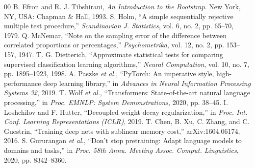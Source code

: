 \documentclass[conference]{IEEEtran}
\begin{document}
\begin{thebibliography}{00}
 B. Efron and R. J. Tibshirani, \textit{An Introduction to the Bootstrap}. New York, NY, USA: Chapman \& Hall, 1993.
 S. Holm, ``A simple sequentially rejective multiple test procedure,'' \textit{Scandinavian J. Statistics}, vol. 6, no. 2, pp. 65--70, 1979.
 Q. McNemar, ``Note on the sampling error of the difference between correlated proportions or percentages,'' \textit{Psychometrika}, vol. 12, no. 2, pp. 153--157, 1947.
 T. G. Dietterich, ``Approximate statistical tests for comparing supervised classification learning algorithms,'' \textit{Neural Computation}, vol. 10, no. 7, pp. 1895--1923, 1998.
 A. Paszke \textit{et al.}, ``PyTorch: An imperative style, high-performance deep learning library,'' in \textit{Advances in Neural Information Processing Systems 32}, 2019.
 T. Wolf \textit{et al.}, ``Transformers: State-of-the-art natural language processing,'' in \textit{Proc. EMNLP: System Demonstrations}, 2020, pp. 38--45.
 I. Loshchilov and F. Hutter, ``Decoupled weight decay regularization,'' in \textit{Proc. Int. Conf. Learning Representations (ICLR)}, 2019.
 T. Chen, B. Xu, C. Zhang, and C. Guestrin, ``Training deep nets with sublinear memory cost,'' arXiv:1604.06174, 2016.
 S. Gururangan \textit{et al.}, ``Don't stop pretraining: Adapt language models to domains and tasks,'' in \textit{Proc. 58th Annu. Meeting Assoc. Comput. Linguistics}, 2020, pp. 8342--8360.
\end{thebibliography}
\end{document}
